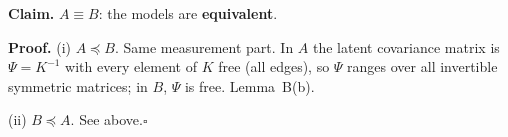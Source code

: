 \documentclass[10pt,a4paper]{article}
\newcommand{\nest}{\preceq}
\begin{document}
\par\bigskip
\noindent\textbf{Claim.} $A \equiv B$: the models are \textbf{equivalent}.\par\smallskip
\noindent\textbf{Proof.} (i) $A\nest B$. Same measurement part. In $A$ the latent covariance matrix is $\Psi=K^{-1}$ with every element of $K$ free (all edges), so $\Psi$ ranges over all invertible symmetric matrices; in $B$, $\Psi$ is free. Lemma~B(b).\par\smallskip
\noindent(ii) $B\nest A$. See above.\hfill$\square$\par\medskip
{}

\clearpage
\end{document}
